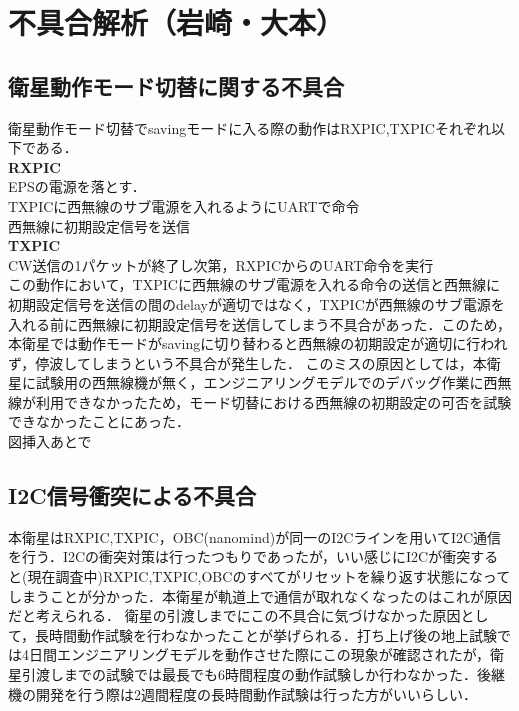 \section{不具合解析（岩崎・大本）}

\subsection{衛星動作モード切替に関する不具合}
衛星動作モード切替でsavingモードに入る際の動作はRXPIC,TXPICそれぞれ以下である．\\
\textbf{RXPIC}\\
EPSの電源を落とす．\\
TXPICに西無線のサブ電源を入れるようにUARTで命令\\
西無線に初期設定信号を送信\\
\textbf{TXPIC}\\
CW送信の1パケットが終了し次第，RXPICからのUART命令を実行\\

この動作において，TXPICに西無線のサブ電源を入れる命令の送信と西無線に初期設定信号を送信の間のdelayが適切ではなく，TXPICが西無線のサブ電源を入れる前に西無線に初期設定信号を送信してしまう不具合があった．このため，本衛星では動作モードがsavingに切り替わると西無線の初期設定が適切に行われず，停波してしまうという不具合が発生した．
このミスの原因としては，本衛星に試験用の西無線機が無く，エンジニアリングモデルでのデバッグ作業に西無線が利用できなかったため，モード切替における西無線の初期設定の可否を試験できなかったことにあった．\\
図挿入あとで


\subsection{I2C信号衝突による不具合}
本衛星はRXPIC,TXPIC，OBC(nanomind)が同一のI2Cラインを用いてI2C通信を行う．I2Cの衝突対策は行ったつもりであったが，いい感じにI2Cが衝突すると(現在調査中)RXPIC,TXPIC,OBCのすべてがリセットを繰り返す状態になってしまうことが分かった．本衛星が軌道上で通信が取れなくなったのはこれが原因だと考えられる．
衛星の引渡しまでにこの不具合に気づけなかった原因として，長時間動作試験を行わなかったことが挙げられる．打ち上げ後の地上試験では4日間エンジニアリングモデルを動作させた際にこの現象が確認されたが，衛星引渡しまでの試験では最長でも6時間程度の動作試験しか行わなかった．後継機の開発を行う際は2週間程度の長時間動作試験は行った方がいいらしい．
